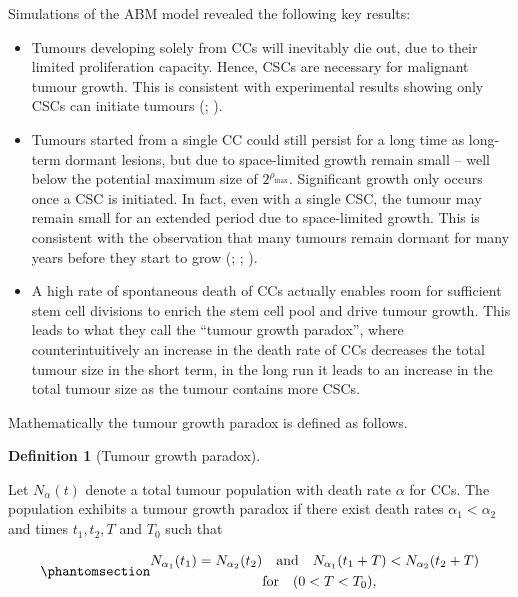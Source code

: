 \documentclass[
  letterpaper,
]{scrreprt}
\providecommand{\tightlist}{%
  \setlength{\itemsep}{0pt}\setlength{\parskip}{0pt}}\usepackage{longtable,booktabs,array}
\theoremstyle{definition}
\newtheorem{definition}{Definition}[chapter]
\theoremstyle{remark}
\begin{document}
Simulations of the ABM model revealed the following key results:

\begin{itemize}
\tightlist
\item
  Tumours developing solely from CCs will inevitably die out, due to
  their limited proliferation capacity. Hence, CSCs are necessary for
  malignant tumour growth. This is consistent with experimental results
  showing only CSCs can initiate tumours
  (;
  ).
\item
  Tumours started from a single CC could still persist for a long time
  as long-term dormant lesions, but due to space-limited growth remain
  small -- well below the potential maximum size of
  \(2^{\rho_\text{max}}\). Significant growth only occurs once a CSC is
  initiated. In fact, even with a single CSC, the tumour may remain
  small for an extended period due to space-limited growth. This is
  consistent with the observation that many tumours remain dormant for
  many years before they start to grow
  (;
  ;
  ).
\item
  A high rate of spontaneous death of CCs actually enables room for
  sufficient stem cell divisions to enrich the stem cell pool and drive
  tumour growth. This leads to what they call the ``tumour growth
  paradox'', where counterintuitively an increase in the death rate of
  CCs decreases the total tumour size in the short term, in the long run
  it leads to an increase in the total tumour size as the tumour
  contains more CSCs.
\end{itemize}

Mathematically the tumour growth paradox is defined as follows.

\begin{definition}[Tumour growth
paradox]\protect\hypertarget{def-tumor-growth-paradox}{}\label{def-tumor-growth-paradox}

Let \(N_\alpha (t)\) denote a total tumour population with death rate
\(\alpha\) for CCs. The population exhibits a tumour growth paradox if
there exist death rates \(\alpha_1 < \alpha_2\) and times \(t_1,t_2, T\)
and \(T_0\) such that

\begin{equation}\phantomsection\label{eq-tumour-growth-paradox}{
\begin{aligned}
N_{\alpha_1}(t_1) = N_{\alpha_2}(t_2)& \quad \text{and} \quad N_{\alpha_1}(t_1 + T) < N_{\alpha_2}(t_2 + T) \\
&\text{for} \quad (0<T<T_0),
\end{aligned}
}\end{equation}

\end{definition}
\end{document}
